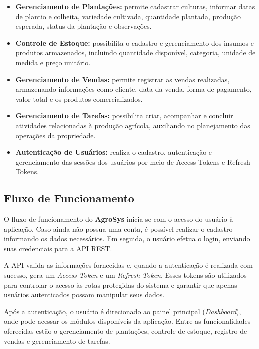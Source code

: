 \documentclass[12pt]{article}
\begin{document}
\begin{itemize}
  \item \textbf{Gerenciamento de Plantações:} permite cadastrar culturas, informar datas de plantio e colheita, variedade cultivada, quantidade plantada, produção esperada, status da plantação e observações.

  \item \textbf{Controle de Estoque:} possibilita o cadastro e gerenciamento dos insumos e produtos armazenados, incluindo quantidade disponível, categoria, unidade de medida e preço unitário.

  \item \textbf{Gerenciamento de Vendas:} permite registrar as vendas realizadas, armazenando informações como cliente, data da venda, forma de pagamento, valor total e os produtos comercializados.

  \item \textbf{Gerenciamento de Tarefas:} possibilita criar, acompanhar e concluir atividades relacionadas à produção agrícola, auxiliando no planejamento das operações da propriedade.

  \item \textbf{Autenticação de Usuários:} realiza o cadastro, autenticação e gerenciamento das sessões dos usuários por meio de Access Tokens e Refresh Tokens.
\end{itemize}


\subsection{Fluxo de Funcionamento}

O fluxo de funcionamento do \textbf{AgroSys} inicia-se com o acesso do usuário à aplicação. Caso ainda não possua uma conta, é possível realizar o cadastro informando os dados necessários. Em seguida, o usuário efetua o login, enviando suas credenciais para a API REST.

A API valida as informações fornecidas e, quando a autenticação é realizada com sucesso, gera um \textit{Access Token} e um \textit{Refresh Token}. Esses tokens são utilizados para controlar o acesso às rotas protegidas do sistema e garantir que apenas usuários autenticados possam manipular seus dados.

Após a autenticação, o usuário é direcionado ao painel principal (\textit{Dashboard}), onde pode acessar os módulos disponíveis da aplicação. Entre as funcionalidades oferecidas estão o gerenciamento de plantações, controle de estoque, registro de vendas e gerenciamento de tarefas.
\end{document}
